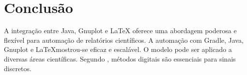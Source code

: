\section{Conclusão}
A integração entre Java, Gnuplot e LaTeX oferece uma abordagem poderosa e flexível para automação de relatórios científicos.
A automação com Gradle, Java, Gnuplot e \LaTeX mostrou-se eficaz e escalável. O modelo pode ser aplicado a diversas áreas científicas.
Segundo \cite{oppenheim}, métodos digitais são essenciais para sinais discretos.

